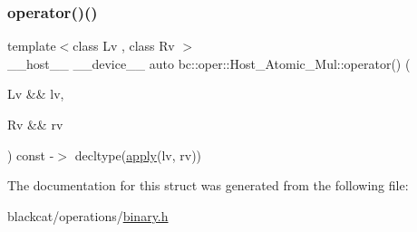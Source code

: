 \mbox{\label{structbc_1_1oper_1_1Host__Atomic__Mul_ae130231ab99206064ad16e2008e9ac6b}} 
\subsubsection{\texorpdfstring{operator()()}{operator()()}}
{\footnotesize\ttfamily template$<$class Lv , class Rv $>$ \\
\+\_\+\+\_\+host\+\_\+\+\_\+ \+\_\+\+\_\+device\+\_\+\+\_\+ auto bc\+::oper\+::\+Host\+\_\+\+Atomic\+\_\+\+Mul\+::operator() (\begin{DoxyParamCaption}\item[{Lv \&\&}]{lv,  }\item[{Rv \&\&}]{rv }\end{DoxyParamCaption}) const -\/$>$ decltype(\hyperlink{structbc_1_1oper_1_1Host__Atomic__Mul_aebf2a0c5db43312f9a9882a43823540c}{apply}(lv, rv)) \hspace{0.3cm}{\ttfamily [inline]}}



The documentation for this struct was generated from the following file\+:\begin{DoxyCompactItemize}
\item 
blackcat/operations/\hyperlink{binary_8h}{binary.\+h}\end{DoxyCompactItemize}

